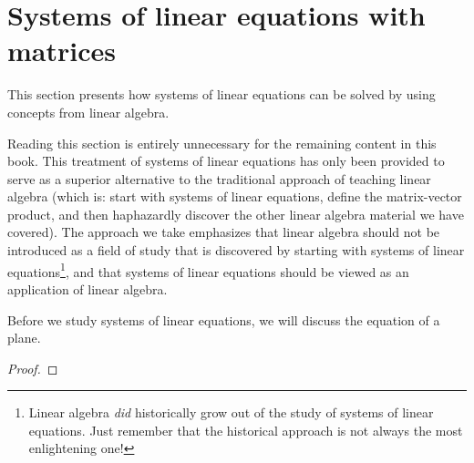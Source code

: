 \newpage

\section{Systems of linear equations with matrices}

This section presents how systems of linear equations can be solved by using concepts from linear algebra.

Reading this section is entirely unnecessary for the remaining content in this book. This treatment of systems of linear equations has only been provided to serve as a superior alternative to the traditional approach of teaching linear algebra (which is: start with systems of linear equations, define the matrix-vector product, and then haphazardly discover the other linear algebra material we have covered). The approach we take emphasizes that linear algebra should not be introduced as a field of study that is discovered by starting with systems of linear equations\footnote{Linear algebra \textit{did} historically grow out of the study of systems of linear equations. Just remember that the historical approach is not always the most enlightening one!}, and that systems of linear equations should be viewed as an application of linear algebra.

Before we study systems of linear equations, we will discuss the equation of a plane.

\begin{theorem}
    
\end{theorem}

\begin{proof}

\end{proof}

